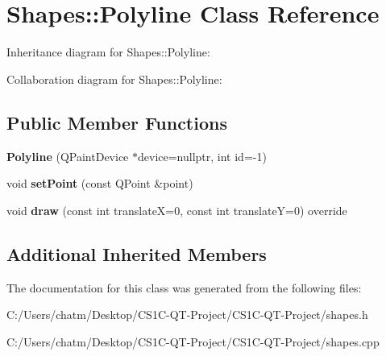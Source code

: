 \hypertarget{class_shapes_1_1_polyline}{}\section{Shapes\+::Polyline Class Reference}
\label{class_shapes_1_1_polyline}


Inheritance diagram for Shapes\+::Polyline\+:


Collaboration diagram for Shapes\+::Polyline\+:
\subsection*{Public Member Functions}
\begin{DoxyCompactItemize}
\item 
\mbox{\label{class_shapes_1_1_polyline_a25816f8875bd2256b7a4cfe440e60684}} 
{\bfseries Polyline} (Q\+Paint\+Device $\ast$device=nullptr, int id=-\/1)
\item 
\mbox{\label{class_shapes_1_1_polyline_a05f5cafac631d6d590c12691c8fe0645}} 
void {\bfseries set\+Point} (const Q\+Point \&point)
\item 
\mbox{\label{class_shapes_1_1_polyline_a48eae0ee364c6677ae934d66a603fdf7}} 
void {\bfseries draw} (const int translateX=0, const int translateY=0) override
\end{DoxyCompactItemize}
\subsection*{Additional Inherited Members}


The documentation for this class was generated from the following files\+:\begin{DoxyCompactItemize}
\item 
C\+:/\+Users/chatm/\+Desktop/\+C\+S1\+C-\/\+Q\+T-\/\+Project/\+C\+S1\+C-\/\+Q\+T-\/\+Project/shapes.\+h\item 
C\+:/\+Users/chatm/\+Desktop/\+C\+S1\+C-\/\+Q\+T-\/\+Project/\+C\+S1\+C-\/\+Q\+T-\/\+Project/shapes.\+cpp\end{DoxyCompactItemize}
